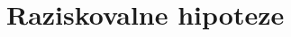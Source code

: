 \documentclass[a4paper]{article}
\begin{document}



\section{Raziskovalne hipoteze}


\end{document}
